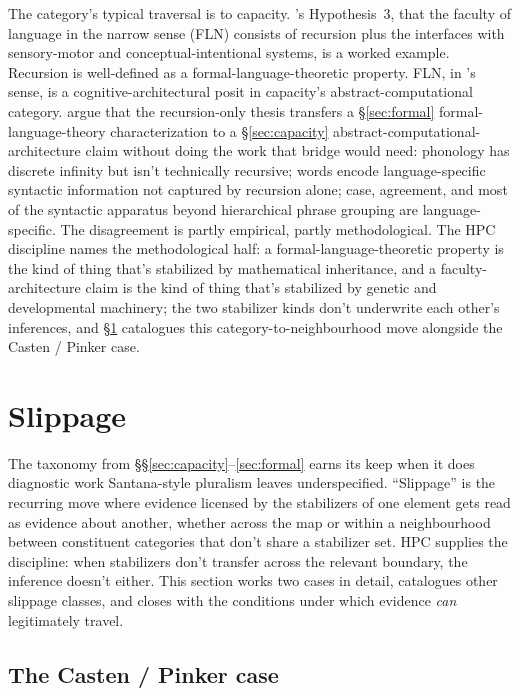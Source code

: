 \documentclass[12pt]{article}
\begin{document}
The category's typical traversal is to capacity. \citeauthor{hauser2002}'s Hypothesis~3, that the faculty of language in the narrow sense (FLN) consists of recursion plus the interfaces with sensory-motor and conceptual-intentional systems, is a worked example. Recursion is well-defined as a formal-language-theoretic property. FLN, in \citeauthor{hauser2002}'s sense, is a cognitive-architectural posit in capacity's abstract-computational category. \citeauthor{pinkerjackendoff2005} argue that the recursion-only thesis transfers a §\ref{sec:formal} formal-language-theory characterization to a §\ref{sec:capacity} abstract-computational-architecture claim without doing the work that bridge would need: phonology has discrete infinity but isn't technically recursive; words encode language-specific syntactic information not captured by recursion alone; case, agreement, and most of the syntactic apparatus beyond hierarchical phrase grouping are language-specific. The disagreement is partly empirical, partly methodological. The HPC discipline names the methodological half: a formal-language-theoretic property is the kind of thing that's stabilized by mathematical inheritance, and a faculty-architecture claim is the kind of thing that's stabilized by genetic and developmental machinery; the two stabilizer kinds don't underwrite each other's inferences, and §\ref{sec:slippage} catalogues this category-to-neighbourhood move alongside the Casten / Pinker case.

\section{Slippage}\label{sec:slippage}

The taxonomy from §§\ref{sec:capacity}--\ref{sec:formal} earns its keep when it does diagnostic work Santana-style pluralism leaves underspecified. \enquote{Slippage} is the recurring move where evidence licensed by the stabilizers of one element gets read as evidence about another, whether across the map or within a neighbourhood between constituent categories that don't share a stabilizer set. HPC supplies the discipline: when stabilizers don't transfer across the relevant boundary, the inference doesn't either. This section works two cases in detail, catalogues other slippage classes, and closes with the conditions under which evidence \emph{can} legitimately travel.

\subsection{The Casten / Pinker case}\label{sec:slippage-pinker}
\end{document}
